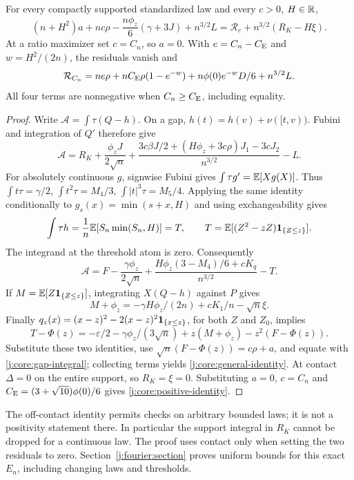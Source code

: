 \begin{theorem}\label{j:core:conservation}
For every compactly supported standardized law and every $c>0$, $H\in\mathbb R$,
\begin{equation}\label{j:core:general-identity}
 (n+H^2)a+nc\rho-\frac{n\phi_z}{6}(\gamma+3J)+n^{3/2}L
 =\mathcal R_c+n^{3/2}(R_K-H\xi).
\end{equation}
At a ratio maximizer set $c=C_n$, so $a=0$. With
$e=C_n-C_{\mathrm E}$ and $w=H^2/(2n)$, the residuals vanish and
\begin{equation}\label{j:core:positive-identity}
 \mathcal R_{C_n}=ne\rho+nC_{\mathrm E}\rho(1-e^{-w})
       +n\phi(0)e^{-w}D/6+n^{3/2}L.
\end{equation}
All four terms are nonnegative when $C_n\ge C_{\mathrm E}$, including equality.
\end{theorem}
\begin{proof}
Write $\mathcal A=\int\tau(Q-h)$. On a gap, $h(t)=h(v)+\nu([t,v))$.
Fubini and integration of $Q'$ therefore give
\begin{equation}\label{j:core:gap-integral}
 \mathcal A=R_K+\frac{\phi_zJ}{2\sqrt n}
 +\frac{3c\beta J/2+(H\phi_z+3c\rho)J_1-3cJ_2}{n^{3/2}}-L.
\end{equation}
For absolutely continuous $g$, signwise Fubini gives
$\int\tau g'=\mathbb E[Xg(X)]$. Thus
$\int t\tau=\gamma/2$, $\int t^2\tau=M_4/3$,
$\int|t|^3\tau=M_5/4$. Applying the same identity conditionally to
$g_s(x)=\min(s+x,H)$ and using exchangeability gives
\[
 \int\tau h=\frac1n\mathbb E[S_n\min(S_n,H)]
 =T,\qquad T=\mathbb E[(Z^2-zZ)\mathbf1_{\{Z\le z\}}].
\]
The integrand at the threshold atom is zero. Consequently
\[
 \mathcal A=F-\frac{\gamma\phi_z}{2\sqrt n}
 +\frac{H\phi_z(3-M_4)/6+cK_q}{n^{3/2}}-T.
\]
If $M=\mathbb E[Z\mathbf1_{\{Z\le z\}}]$, integrating $X(Q-h)$ against $P$ gives
\[
 M+\phi_z=-\gamma H\phi_z/(2n)+cK_1/n-\sqrt n\xi.
\]
Finally $q_z(x)=(x-z)^2-2(x-z)^2\mathbf1_{\{x\le z\}}$, for both $Z$ and
$Z_0$, implies
\[
 T-\Phi(z)=-\varepsilon/2-\gamma\phi_z/(3\sqrt n)
               +z(M+\phi_z)-z^2(F-\Phi(z)).
\]
Substitute these two identities, use $\sqrt n(F-\Phi(z))=c\rho+a$,
and equate with \eqref{j:core:gap-integral}; collecting terms yields
\eqref{j:core:general-identity}. At contact $\Delta=0$ on the entire
support, so $R_K=\xi=0$. Substituting $a=0$, $c=C_n$ and
$C_{\mathrm E}=(3+\sqrt{10})\phi(0)/6$ gives \eqref{j:core:positive-identity}.
\end{proof}
The off-contact identity permits checks on arbitrary bounded laws; it
is not a positivity statement there. In particular the support integral
in $R_K$ cannot be dropped for a continuous law. The proof uses contact
only when setting the two residuals to zero. Section~\ref{j:fourier:section}
proves uniform bounds for this exact $E_n$, including changing laws and
thresholds.

